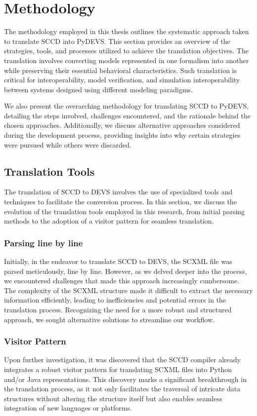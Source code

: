 \chapter{Methodology}
\label{chapt:Methodology}
The methodology employed in this thesis outlines the systematic approach taken to translate SCCD into PyDEVS. This section provides an overview of the strategies, tools, and processes utilized to achieve the translation objectives. 
The translation involves converting models represented in one formalism into another while preserving their essential behavioral characteristics. Such translation is critical for interoperability, model verification, and simulation 
interoperability between systems designed using different modeling paradigms.

We also present the overarching methodology for translating SCCD to PyDEVS, detailing the steps involved, challenges encountered, and the rationale behind the chosen approaches. Additionally, we discuss alternative 
approaches considered during the development process, providing insights into why certain strategies were pursued while others were discarded.

\section{Translation Tools}

The translation of SCCD to DEVS involves the use of specialized tools and techniques to facilitate the conversion process. In this section, we discuss the evolution of the translation tools employed in this research, from initial 
parsing methods to the adoption of a visitor pattern for seamless translation.

\subsection{Parsing line by line}
Initially, in the endeavor to translate SCCD to DEVS, the SCXML file was parsed meticulously, line by line. However, as we delved deeper into the process, we encountered challenges that made this approach increasingly cumbersome. 
The complexity of the SCXML structure made it difficult to extract the necessary information efficiently, leading to inefficiencies and potential errors in the translation process. Recognizing the need for a more robust and 
structured approach, we sought alternative solutions to streamline our workflow.

\subsection{Visitor Pattern}
Upon further investigation, it was discovered that the SCCD compiler already integrates a robust visitor pattern for translating SCXML files into Python and/or Java representations. This discovery marks a significant breakthrough 
in the translation process, as it not only facilitates the traversal of intricate data structures without altering the structure itself but also enables seamless integration of new languages or platforms.

